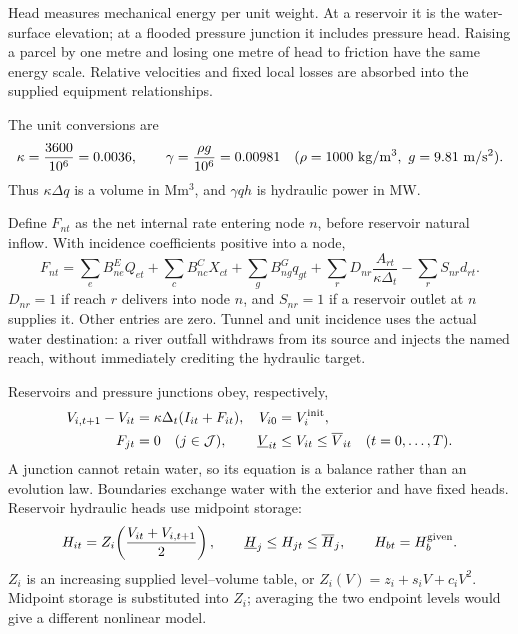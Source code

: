 \documentclass[10pt,a4paper]{article}
\begin{document}
Head measures mechanical energy per unit weight. At a reservoir it is the
water-surface elevation; at a flooded pressure junction it includes pressure
head. Raising a parcel by one metre and losing one metre of head to friction
have the same energy scale. Relative velocities and fixed local losses are
absorbed into the supplied equipment relationships.

The unit conversions are
\begin{equation}
\kappa=\frac{3600}{10^6}=0.0036,\qquad
\gamma=\frac{\rho g}{10^6}=0.00981
\quad(\rho=1000\ {\rm kg/m^3},\ g=9.81\ {\rm m/s^2}).
\label{eq:units}
\end{equation}
Thus $\kappa\Delta q$ is a volume in Mm$^3$, and $\gamma qh$ is hydraulic
power in MW.

Define $F_{nt}$ as the net internal rate entering node $n$, before reservoir
natural inflow. With incidence coefficients positive into a node,
\begin{equation}
F_{nt}=\sum_e B^{E}_{ne}Q_{et}
       +\sum_c B^{C}_{nc}X_{ct}
       +\sum_g B^{G}_{ng}q_{gt}
       +\sum_r D_{nr}\frac{A_{rt}}{\kappa\Delta_t}
       -\sum_r S_{nr}d_{rt}.
\label{eq:incidence}
\end{equation}
$D_{nr}=1$ if reach $r$ delivers into node $n$, and $S_{nr}=1$ if
a reservoir outlet at $n$ supplies it. Other entries are zero.
Tunnel and unit incidence uses the actual water destination:
a river outfall withdraws from its source and injects the named reach,
without immediately crediting the hydraulic target.

Reservoirs and pressure junctions obey, respectively,
\begin{align}
V_{i,t+1}-V_{it}&=\kappa\Delta_t(I_{it}+F_{it}),
&V_{i0}&=V_i^{\rm init}, \label{eq:storage}\\
F_{jt}&=0 \quad(j\in\mathcal J),&
\underline V_{it}&\le V_{it}\le\overline V_{it}
\quad(t=0,\ldots,T). \label{eq:junction}
\end{align}
A junction cannot retain water, so its equation is a balance rather than an
evolution law. Boundaries exchange water with the exterior and have fixed
heads. Reservoir hydraulic heads use midpoint storage:
\begin{equation}
H_{it}=Z_i\!\left(\frac{V_{it}+V_{i,t+1}}2\right),\qquad
\underline H_j\le H_{jt}\le\overline H_j,\qquad
H_{bt}=H_b^{\rm given}.
\label{eq:heads}
\end{equation}
$Z_i$ is an increasing supplied level--volume table, or
$Z_i(V)=z_i+s_iV+c_iV^2$. Midpoint storage is substituted into $Z_i$;
averaging the two endpoint levels would give a different nonlinear model.
\end{document}

